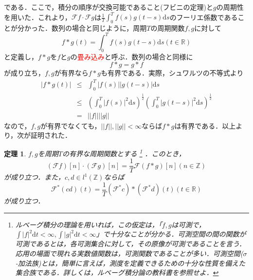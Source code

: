\documentclass[a4j]{jsbook}
\newtheorem{theorem}{定理}
\numberwithin{theorem}{chapter}  %
\begin{document}
である．ここで，積分の順序が交換可能であること(フビニの定理)と\(g\)の周期性を用いた．これより，\(\mathcal{F}f\cdot\mathcal{F}g\)は\(\displaystyle\frac{1}{T}\int_0^T f(s)g(t-s)\mathrm{d}s\)のフーリエ係数であることが分かった．数列の場合と同じように，周期\(T\)の周期関数\(f, g\)に対して
\begin{equation*}
    f*g(t)=\int_0^T f(s)g(t-s)\mathrm{d}s (t\in\mathbb{R})
\end{equation*}
と定義し，\(f*g\)を\(f\)と\(g\)の\textcolor{red}{畳み込み}と呼ぶ．数列の場合と同様に
\begin{equation*}
    f*g=g*f
\end{equation*}
が成り立ち，\(f, g\)が有界なら\(f*g\)も有界である．実際，シュワルツの不等式より
\begin{eqnarray*}
|f*g(t)|&\leq&\int_0^T |f(s)||g(t-s)|\mathrm{d}s \\
&\leq&\left(\int_0^T |f(s)|^2\mathrm{d}s\right)^{\frac{1}{2}}\left(\int_0^T |g(t-s)|^2\mathrm{d}s\right)^{\frac{1}{2}} \\
&=&||f||||g||
\end{eqnarray*}
なので，\(f, g\)が有界でなくても，\(||f||, ||g||<\infty\)ならば\(f*g\)は有界である．以上より，次が証明された．
\begin{theorem}
\label{th2-12}
\(f, g\)を周期\(T\)の有界な周期関数とする
\footnote{ルベーグ積分の理論を用いれば，この仮定は，「\(f, g\)は可測で，\(\displaystyle\int|f|^2\mathrm{d}t<\infty, \int|g|^2\mathrm{d}t<\infty\)」で十分なことが分かる．可測空間の間の関数が可測であるとは，各可測集合に対して，その原像が可測であることを言う．応用の場面で現れる実数値関数は，可測関数であることが多い．可測空間(\(\sigma\)-加法族)とは，簡単に言えば，測度を定義できるための十分な性質を備えた集合族である．詳しくは，ルベーグ積分論の教科書を参照せよ．}
．このとき，
\begin{equation*}
    (\mathcal{F}f)[n]\cdot(\mathcal{F}g)[n]=\frac{1}{T}\mathcal{F}(f*g)[n] (n\in\mathbb{Z})
\end{equation*}
が成り立つ．また，\(c, d\in l^1(\mathbb{Z})\)ならば
\begin{equation*}
    \mathcal{F}^*(cd)(t)=\frac{1}{T}(\mathcal{F}^* c)*(\mathcal{F}^* d)(t) (t\in\mathbb{R})
\end{equation*}
が成り立つ．
\end{theorem}
\end{document}
